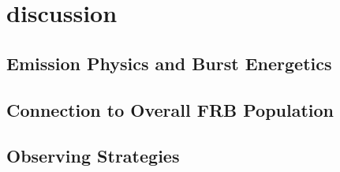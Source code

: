 \section{discussion}

\subsection{Emission Physics and Burst Energetics}



\subsection{Connection to Overall FRB Population}



\subsection{Observing Strategies}